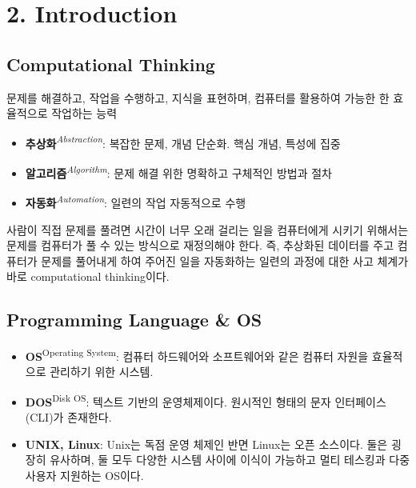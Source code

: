 
\section[2. Introduction - {\it 들어가며}]{2. Introduction}

\subsection{Computational Thinking}

문제를 해결하고, 작업을 수행하고, 지식을 표현하며, 컴퓨터를 활용하여 가능한 한 효율적으로 작업하는 능력

\begin{itemize}
    \item \textbf{추상화}\textit{\textsuperscript{Abstraction}}: 복잡한 문제, 개념 단순화. 핵심 개념, 특성에 집중
    \item \textbf{알고리즘}\textit{\textsuperscript{Algorithm}}: 문제 해결 위한 명확하고 구체적인 방법과 절차
    \item \textbf{자동화}\textit{\textsuperscript{Automation}}: 일련의 작업 자동적으로 수행
\end{itemize}
사람이 직접 문제를 풀려면 시간이 너무 오래 걸리는 일을 컴퓨터에게 시키기 위해서는 문제를 컴퓨터가 풀 수 있는 방식으로 재정의해야 한다. 즉, 추상화된 데이터를 주고 컴퓨터가 문제를 풀어내게 하여 주어진 일을 자동화하는 일련의 과정에 대한 사고 체계가 바로 computational thinking이다.

\subsection{Programming Language \& OS}

\begin{itemize}
    \item \textbf{OS}\textsuperscript{Operating System}: 컴퓨터 하드웨어와 소프트웨어와 같은 컴퓨터 자원을 효율적으로 관리하기 위한 시스템.
    \item \textbf{DOS}\textsuperscript{Disk OS}: 텍스트 기반의 운영체제이다. 원시적인 형태의 문자 인터페이스(CLI)가 존재한다.
    \item \textbf{UNIX, Linux}: Unix는 독점 운영 체제인 반면 Linux는 오픈 소스이다. 둘은 굉장히 유사하며, 둘 모두 다양한 시스템 사이에 이식이 가능하고 멀티 테스킹과 다중 사용자 지원하는 OS이다.
\end{itemize}


